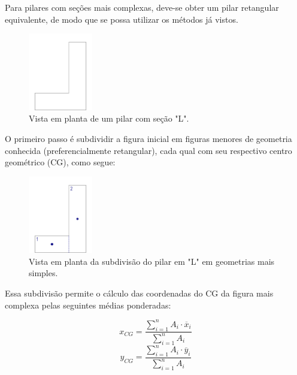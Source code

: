 Para pilares com seções mais complexas, deve-se obter um pilar retangular equivalente, de modo que se possa utilizar os métodos já vistos.

\begin{figure}[H]
	\begin{center}
	\caption{Vista em planta de um pilar com seção "L".}
    	\includegraphics[width=0.25\textwidth]{Fundacoes-rasas-ou-diretas/Imagens/Sapatas-com-secao-LUZ.png}
	\end{center}
\end{figure}

O primeiro passo é subdividir a figura inicial em figuras menores de geometria conhecida (preferencialmente retangular), cada qual com seu respectivo centro geométrico (CG), como segue:

\begin{figure}[H]
	\begin{center}
	\caption{Vista em planta da subdivisão do pilar em "L" em geometrias mais simples.}
    	\includegraphics[width=0.25\textwidth]{Fundacoes-rasas-ou-diretas/Imagens/Sapatas-com-secao-LUZ-2.png}
	\end{center}
\end{figure}

Essa subdivisão permite o cálculo das coordenadas do CG da figura mais complexa pelas seguintes médias ponderadas:

\begin{equation}x_{CG}=\frac{\displaystyle\sum_{i=1}^{n} A_i\cdot \overline{x}_i}{\displaystyle\sum_{i=1}^{n} A_i}\end{equation}
\begin{equation}y_{CG}=\frac{\displaystyle\sum_{i=1}^{n} A_i\cdot \overline{y}_i}{\displaystyle\sum_{i=1}^{n} A_i}\end{equation}

